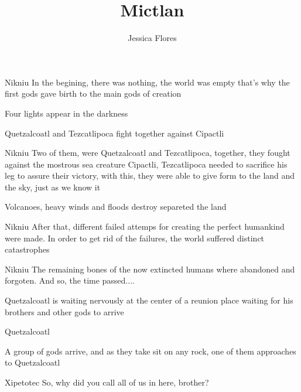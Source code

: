 \documentclass{screenplay}[2012/06/30]
\title{Mictlan}
\author{Jessica Flores}
\begin{document}
\coverpage
\fadein




\begin{dialogue}{Nikniu}
In the begining, there was nothing, the world was empty that's why the first gods gave birth to the main gods of creation 
\end{dialogue}

Four lights appear in the darkness 



Quetzalcoatl and Tezcatlipoca fight together against Cipactli
\begin{dialogue}[continuing]{Nikniu}
Two of them, were Quetzalcoatl and Tezcatlipoca, together, they fought against the mostrous sea creature Cipactli, Tezcatlipoca needed to sacrifice his leg to assure their victory, with this, they were able to give form to the land and the sky, just as we know it
\end{dialogue}



Volcanoes, heavy winds and floods destroy separeted the land
\begin{dialogue}[continuing]{Nikniu}
After that, different failed attemps for creating the perfect humankind were made. In order to get rid of the failures, the world suffered distinct catastrophes
\end{dialogue}

\begin{dialogue}[continuing]{Nikniu}
The remaining bones of the now extincted humans where abandoned and forgoten. And so, the time passed....
\end{dialogue}

\fadein
{}

Quetzalcoatl is waiting nervously at the center of a reunion place waiting for his brothers and other gods to arrive

\begin{dialogue}{Quetzalcoatl}

\end{dialogue}

A group of gods arrive, and as they take sit on any rock, one of them approaches to Quetzalcoatl

\begin{dialogue}{Xipetotec}
So, why did you call all of us in here, brother?
\end{dialogue}
\end{document}
